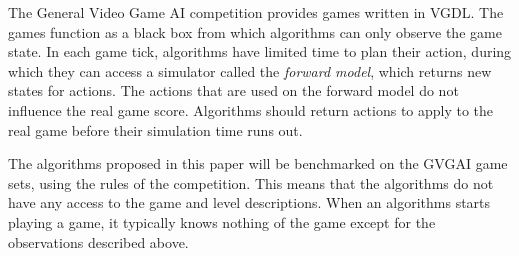 The General Video Game AI competition provides games written in VGDL\@.
The games function as a black box from which algorithms can only observe the
game state. In each game tick, algorithms have limited time to plan their
action, during which they can access a simulator called the \emph{forward
model}, which returns new states for actions. The actions that are used on the
forward model do not influence the real game score. Algorithms should return
actions to apply to the real game before their simulation time runs out.

The algorithms proposed in this paper will be benchmarked on the GVGAI game
sets, using the rules of the competition. This means that the algorithms do not
have any access to the game and level descriptions. When an algorithms starts
playing a game, it typically knows nothing of the game except for the
observations described above.
